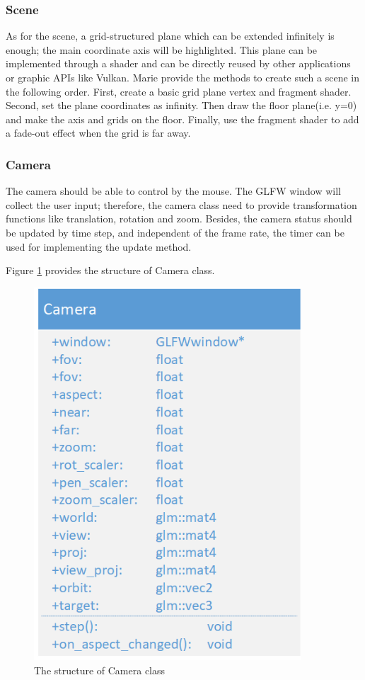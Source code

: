 \subsubsection{Scene}

As for the scene, a grid-structured plane which can be extended infinitely is enough; the main coordinate axis will be highlighted. This plane can be implemented through a shader and can be directly reused by other applications or graphic APIs like Vulkan. Marie \cite{scene} provide the methods to create such a scene in the following order. First, create a basic grid plane vertex and fragment shader. Second, set the plane coordinates as infinity. Then draw the floor plane(i.e. y=0) and make the axis and grids on the floor. Finally, use the fragment shader to add a fade-out effect when the grid is far away.

\subsubsection{Camera}
\label{ds:camera}

The camera should be able to control by the mouse. The GLFW window will collect the user input; therefore, the camera class need to provide transformation functions like translation, rotation and zoom. Besides, the camera status should be updated by time step, and independent of the frame rate, the timer can be used for implementing the update method.

\clearpage

Figure \ref{ds:cameraclass} provides the structure of Camera class.

\begin{figure}[htbp]
    \centering
    \includegraphics[width=10cm]{Images/Chap4/Camera.png}
    \caption{The structure of Camera class}
    \label{ds:cameraclass}
\end{figure}

